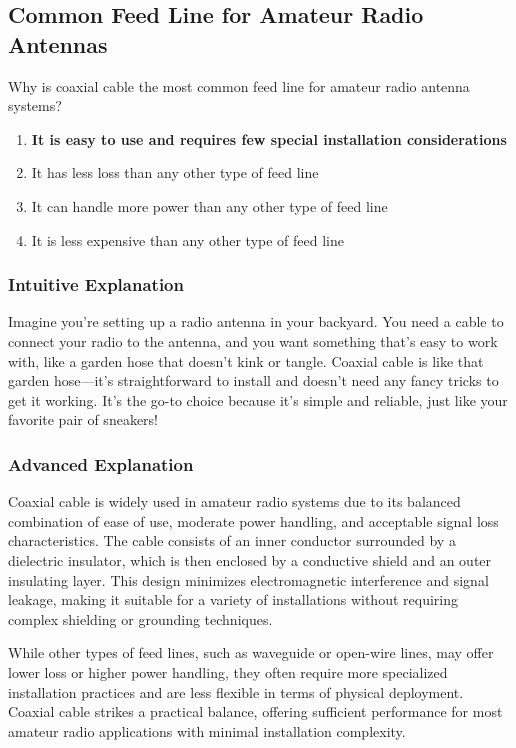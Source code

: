\subsection{Common Feed Line for Amateur Radio Antennas}
\label{T9B03}

\begin{tcolorbox}[colback=gray!10!white,colframe=black!75!black,title=T9B03]
Why is coaxial cable the most common feed line for amateur radio antenna systems?
\begin{enumerate}[label=\Alph*)]
    \item \textbf{It is easy to use and requires few special installation considerations}
    \item It has less loss than any other type of feed line
    \item It can handle more power than any other type of feed line
    \item It is less expensive than any other type of feed line
\end{enumerate}
\end{tcolorbox}

\subsubsection{Intuitive Explanation}
Imagine you’re setting up a radio antenna in your backyard. You need a cable to connect your radio to the antenna, and you want something that’s easy to work with, like a garden hose that doesn’t kink or tangle. Coaxial cable is like that garden hose—it’s straightforward to install and doesn’t need any fancy tricks to get it working. It’s the go-to choice because it’s simple and reliable, just like your favorite pair of sneakers!

\subsubsection{Advanced Explanation}
Coaxial cable is widely used in amateur radio systems due to its balanced combination of ease of use, moderate power handling, and acceptable signal loss characteristics. The cable consists of an inner conductor surrounded by a dielectric insulator, which is then enclosed by a conductive shield and an outer insulating layer. This design minimizes electromagnetic interference and signal leakage, making it suitable for a variety of installations without requiring complex shielding or grounding techniques.

While other types of feed lines, such as waveguide or open-wire lines, may offer lower loss or higher power handling, they often require more specialized installation practices and are less flexible in terms of physical deployment. Coaxial cable strikes a practical balance, offering sufficient performance for most amateur radio applications with minimal installation complexity.

